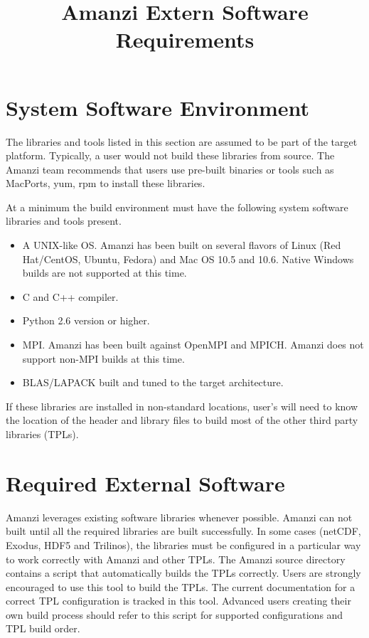 \documentclass[12pt]{article}
\begin{document}
\title{Amanzi Extern Software Requirements}

\maketitle


\section*{System Software Environment}
The libraries and tools listed in this section are assumed to be part of the target platform. Typically, 
a user would not build these libraries from source.  The Amanzi team recommends that users use
pre-built binaries or tools such as MacPorts, yum, rpm to install these libraries.  

At a minimum the build environment must have the following system software libraries and tools present.
\begin{itemize}
\item A UNIX-like OS. Amanzi has been built on several flavors of Linux (Red Hat/CentOS, Ubuntu, Fedora) and 
Mac OS 10.5 and 10.6. Native Windows builds are not supported at this time.
\item C and C++ compiler.
\item Python 2.6 version or higher.
\item MPI. Amanzi has been built against OpenMPI and MPICH. Amanzi does not support non-MPI builds at this time.
\item BLAS/LAPACK built and tuned to the target architecture.
\end{itemize}

If these libraries are installed in non-standard locations, user's will need to know the location 
of the header and library files to build most of the other third party libraries (TPLs).

\section*{Required External Software}
Amanzi leverages existing software libraries whenever possible. Amanzi can not built until all the required 
libraries are built successfully. In some cases (netCDF, Exodus, HDF5 and Trilinos), the libraries must be configured
in a particular way to work correctly with Amanzi and other TPLs. The Amanzi source directory contains a 
script that automatically builds the TPLs correctly. Users are strongly encouraged to use this tool to build the
TPLs. The current documentation for a correct TPL configuration is tracked in this tool. Advanced users creating
their own build process should refer to this script for supported configurations and TPL build order.
\end{document}
